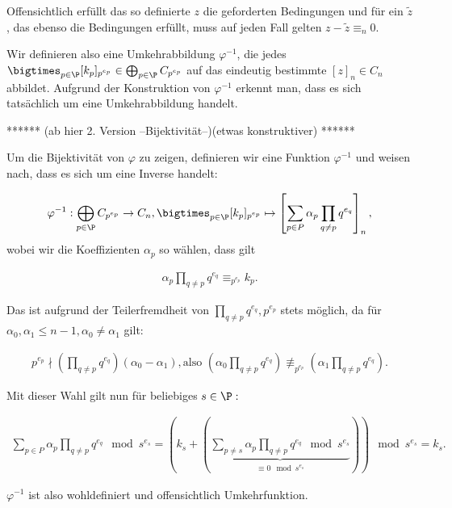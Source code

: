\begin{solution}
Offensichtlich erfüllt das so definierte $z$ die geforderten Bedingungen und für ein $\tilde{z}$, das ebenso die Bedingungen erfüllt, muss auf jeden Fall gelten $z-\tilde{z} \equiv_n 0$.

Wir definieren also eine Umkehrabbildung $\varphi^{-1}$, die jedes $\bigtimes_{p \in \P} [k_p]_{p^{e_p}} \in \bigoplus_{p \in \P} C_{p^{e_p}}$ auf das eindeutig bestimmte $[z]_n \in C_n$ abbildet. Aufgrund der Konstruktion von $\varphi^{-1}$ erkennt man, dass es sich tatsächlich um eine Umkehrabbildung handelt.

****** (ab hier 2. Version --Bijektivität--)(etwas konstruktiver) ******

Um die Bijektivität von $\varphi$ zu zeigen, definieren wir eine Funktion $\varphi^{-1}$ und weisen nach, dass es sich um eine Inverse handelt:

\begin{align*}
   \varphi^{-1}: \bigoplus_{p \in \P} C_{p^{e_p}} \rightarrow C_n, \bigtimes_{p \in \P} [k_p]_{p^{e_p}}
   \mapsto \left[\sum_{p \in P} \alpha_p \prod_{q \neq p} q^{e_q}\right]_n,
\end{align*}
wobei wir die Koeffizienten $\alpha_p$ so wählen, dass gilt

\begin{align*}
    \alpha_p \prod_{q \neq p} q^{e_q} \equiv_{p^{e_{p}}} k_{p}.
\end{align*}

Das ist aufgrund der Teilerfremdheit von $\prod_{q \neq p} q^{e_q}, p^{e_p}$ stets möglich,
da für $\alpha_0, \alpha_1 \leq n-1, \alpha_0 \neq \alpha_1$ gilt:

\begin{align*}
    p^{e_{p}} \nmid \left(\prod_{q \neq p} q^{e_q}\right) (\alpha_0 - \alpha_1), \text{also~}
    \left(\alpha_0 \prod_{q \neq p} q^{e_q}\right) \not\equiv_{p^{e_p}}
    \left(\alpha_1 \prod_{q \neq p} q^{e_q}\right).
\end{align*}

Mit dieser Wahl gilt nun für beliebiges $s \in \P:$

\begin{align*}
\sum_{p \in P} \alpha_p \prod_{q \neq p} q^{e_q} \mod s^{e_s} =
\left(k_s + \left(\underbrace{\sum_{p \neq s} \alpha_p \prod_{q \neq p} q^{e_q}
\mod s^{e_s}}_{\substack{\equiv 0 \mod s^{e_s}}}\right)\right) \mod s^{e_s} = k_s.
\end{align*}

$\varphi^{-1}$ ist also wohldefiniert und offensichtlich Umkehrfunktion.
\end{solution}
